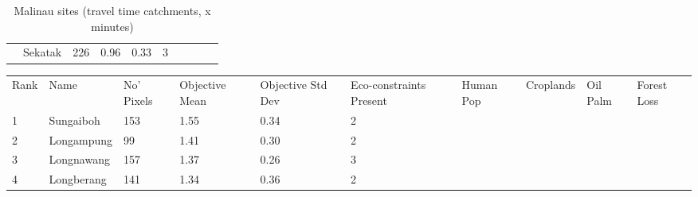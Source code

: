\begin{table}[ht]
\begin{tabular}{C{0.05\textwidth}C{0.15\textwidth}C{0.08\textwidth}C{0.08\textwidth}C{0.08\textwidth}C{0.08\textwidth}C{0.08\textwidth}C{0.08\textwidth}C{0.08\textwidth}C{0.08\textwidth}}
   & Sekatak & 226 & \textcolor[HTML]{000000}{0.96} & \textcolor[HTML]{FFFFFF}{0.33} & \textcolor[HTML]{FFFFFF}{3} &  &  &  &  \\ 
  \end{tabular}
\endgroup
\caption{Malinau sites (travel time catchments, x minutes)} 
\label{tab:malinau_time}
\end{table}
\begin{table}[ht]
\centering
\begingroup\fontsize{9pt}{10pt}\selectfont
\begin{tabular}{C{0.05\textwidth}C{0.15\textwidth}C{0.08\textwidth}C{0.08\textwidth}C{0.08\textwidth}C{0.08\textwidth}C{0.08\textwidth}C{0.08\textwidth}C{0.08\textwidth}C{0.08\textwidth}}
 Rank & Name & No' Pixels & Objective Mean & Objective Std Dev & Eco-constraints  Present & Human Pop & Croplands & Oil Palm & Forest Loss \\ 
 {1} & Sungaiboh & 153 & \textcolor[HTML]{FFFFFF}{1.55} & \textcolor[HTML]{FFFFFF}{0.34} & \textcolor[HTML]{000000}{2} &  &  &  &  \\ 
  {2} & Longampung &  99 & \textcolor[HTML]{FFFFFF}{1.41} & \textcolor[HTML]{000000}{0.30} & \textcolor[HTML]{000000}{2} &  &  &  &  \\ 
  {3} & Longnawang & 157 & \textcolor[HTML]{FFFFFF}{1.37} & \textcolor[HTML]{000000}{0.26} & \textcolor[HTML]{FFFFFF}{3} &  &  &  &  \\ 
  {4} & Longberang & 141 & \textcolor[HTML]{FFFFFF}{1.34} & \textcolor[HTML]{FFFFFF}{0.36} & \textcolor[HTML]{000000}{2} &  &  &  &  \\ 

\end{tabular}
\end{table}
